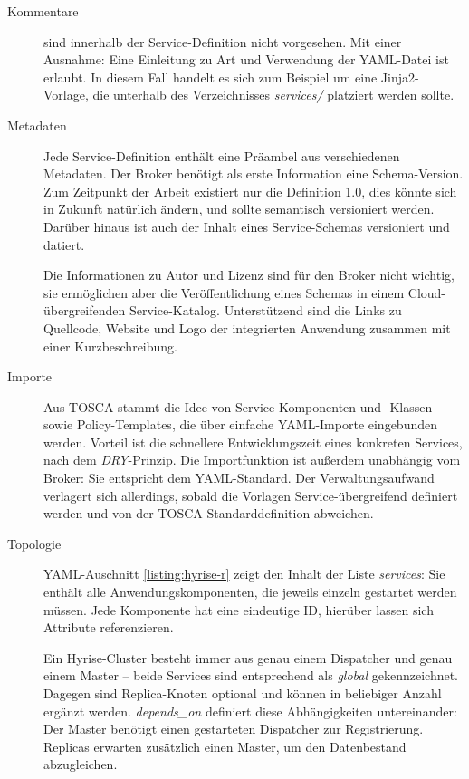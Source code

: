\begin{description}
	
	\item[Kommentare] sind innerhalb der Service-Definition nicht vorgesehen. Mit einer Ausnahme: Eine Einleitung zu Art und Verwendung der YAML-Datei ist erlaubt. In diesem Fall handelt es sich zum Beispiel um eine Jinja2-Vorlage, die unterhalb des Verzeichnisses \emph{services/} platziert werden sollte.
	
	\item[Metadaten] Jede Service-Definition enthält eine Präambel aus verschiedenen Metadaten. Der Broker benötigt als erste Information eine Schema-Version. Zum Zeitpunkt der Arbeit existiert nur die Definition 1.0, dies könnte sich in Zukunft natürlich ändern, und sollte semantisch versioniert werden. Darüber hinaus ist auch der Inhalt eines Service-Schemas versioniert und datiert. 
	
	Die Informationen zu Autor und Lizenz sind für den Broker nicht wichtig, sie ermöglichen aber die Veröffentlichung eines Schemas in einem Cloud-übergreifenden Service-Katalog. Unterstützend sind die Links zu Quellcode, Website und Logo der integrierten Anwendung zusammen mit einer Kurzbeschreibung.

	\item[Importe] Aus TOSCA stammt die Idee von Service-Komponenten und -Klassen sowie Policy-Templates, die über einfache YAML-Importe eingebunden werden. Vorteil ist die schnellere Entwicklungszeit eines konkreten Services, nach dem \emph{DRY}-Prinzip. Die Importfunktion ist außerdem unabhängig vom Broker: Sie entspricht dem YAML-Standard. Der Verwaltungsaufwand verlagert sich allerdings, sobald die Vorlagen Service-übergreifend definiert werden und von der TOSCA-Standarddefinition abweichen.
	
	\item[Topologie] YAML-Auschnitt \autoref{listing:hyrise-r} zeigt den Inhalt der Liste \emph{services}: Sie enthält alle Anwendungskomponenten, die jeweils einzeln gestartet werden müssen. Jede Komponente hat eine eindeutige ID, hierüber lassen sich Attribute referenzieren.
	
	Ein Hyrise-Cluster besteht immer aus genau einem Dispatcher und genau einem Master -- beide Services sind entsprechend als \emph{global} gekennzeichnet. Dagegen sind Replica-Knoten optional und können in beliebiger Anzahl ergänzt werden. \emph{depends\_on} definiert diese Abhängigkeiten untereinander: Der Master benötigt einen gestarteten Dispatcher zur Registrierung. Replicas erwarten zusätzlich einen Master, um den Datenbestand abzugleichen.	
	

\end{description}
